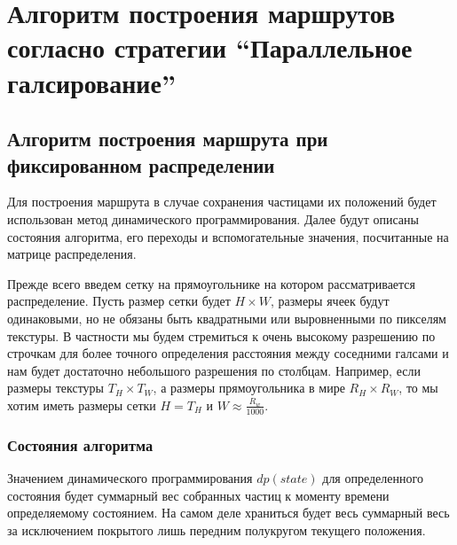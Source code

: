 \chapter{Алгоритм построения маршрутов согласно стратегии
``Параллельное галсирование''}
\section{Алгоритм построения маршрута при
 фиксированном распределении}

\def\dprule{ \rule[-2ex]{0pt}{4ex} }

Для построения маршрута в случае сохранения частицами их положений будет использован метод
динамического программирования. Далее будут описаны состояния алгоритма, его переходы и
вспомогательные значения, посчитанные на матрице распределения.

Прежде всего введем сетку на прямоугольнике на котором рассматривается распределение.
Пусть размер сетки будет $H \times W$, размеры ячеек будут одинаковыми, но не обязаны
быть квадратными или выровненными по пикселям текстуры. В частности мы будем стремиться
к очень высокому разрешению по строчкам для более точного определения расстояния между
соседними галсами и нам будет достаточно небольшого разрешения по столбцам. Например,
если размеры текстуры $T_H \times T_W$, а размеры прямоугольника в мире $R_H \times R_W$,
то мы хотим иметь размеры сетки $H = T_H$ и $W \approx \frac {R_w} {1000}$.

\subsection{Состояния алгоритма}
Значением динамического программирования $dp(state)$ для определенного состояния будет
суммарный вес собранных частиц к моменту времени определяемому состоянием. На самом деле
храниться будет весь суммарный весь за исключением покрытого лишь передним полукругом
текущего положения. 

